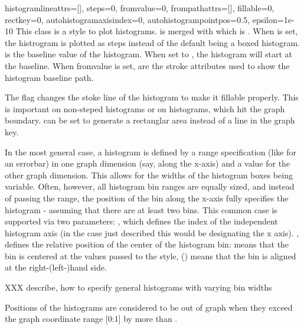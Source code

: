 \begin{classdesc}{histogram}{lineattrs=[], steps=0, fromvalue=0, %
                             frompathattrs=[], fillable=0, rectkey=0,
                             autohistogramaxisindex=0,
                             autohistogrampointpos=0.5, epsilon=1e-10}
  This class is a style to plot histograms.  is merged
  with  which is . When
   is set, the histrogram is plotted as steps instead of
  the default being a boxed histogram.  is the baseline
  value of the histogram. When set to , the histogram will
  start at the baseline. When fromvalue is set, 
  are the stroke attributes used to show the histogram baseline path.

  The  flag changes the stoke line of the histogram to
  make it fillable properly. This is important on non-steped
  histograms or on histograms, which hit the graph boundary.
   can be set to generate a rectanglar area instead of a
  line in the graph key.

  In the most general case, a histogram is defined by a range
  specification (like for an errorbar) in one graph dimension (say,
  along the x-axis) and a value for the other graph dimension. This
  allows for the widths of the histogram boxes being variable. Often,
  however, all histogram bin ranges are equally sized, and instead of
  passing the range, the position of the bin along the x-axis fully
  specifies the histogram - assuming that there are at least two bins.
  This common case is supported via two parameters:
  , which defines the index of the
  independent histogram axis (in the case just described this would be
   designating the x axis). ,
  defines the relative position of the center of the histogram bin:
   means that the bin is centered at the values passed to
  the style,  () means that the bin is aligned at the
  right-(left-)hand side.

  XXX describe, how to specify general histograms with varying bin widths

  Positions of the histograms are considered to be out of graph when
  they exceed the graph coordinate range [0:1] by more than
  .
\end{classdesc} %

